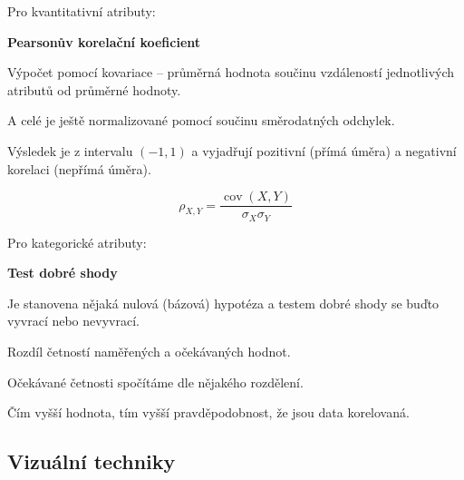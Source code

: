 \begin{compactitem}
    \item Pro kvantitativní atributy: \begin{compactitem}
        \item \textbf{Pearsonův korelační koeficient} \begin{compactitem}
            \item Výpočet pomocí kovariace -- průměrná hodnota součinu vzdáleností jednotlivých atributů od průměrné hodnoty.

            \item A celé je ještě normalizované pomocí součinu směrodatných odchylek.

            \item Výsledek je z intervalu $(-1, 1)$ a vyjadřují pozitivní (přímá úměra) a negativní korelaci (nepřímá úměra).
        \end{compactitem}
        \begin{equation}
            {\displaystyle \rho _{X,Y}={\frac {\operatorname {cov} (X,Y)}{\sigma _{X}\sigma _{Y}}}}
        \end{equation}
    \end{compactitem}

    \item Pro kategorické atributy: \begin{compactitem}
        \item \textbf{Test dobré shody} \begin{compactitem}
            \item Je stanovena nějaká nulová (bázová) hypotéza a testem dobré shody se buďto vyvrací nebo nevyvrací.

            \item Rozdíl četností naměřených a očekávaných hodnot.

            \item Očekávané četnosti spočítáme dle nějakého rozdělení.

            \item Čím vyšší hodnota, tím vyšší pravděpodobnost, že jsou data korelovaná.
        \end{compactitem}
    \end{compactitem}
\end{compactitem}

\subsection{Vizuální techniky}

